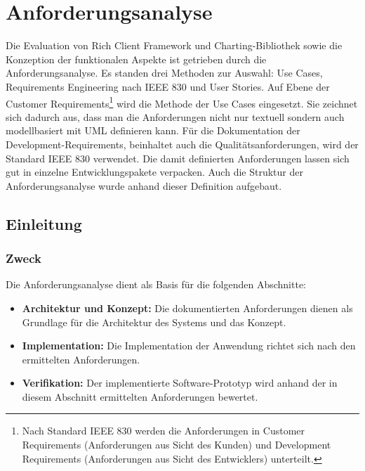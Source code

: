 \chapter{Anforderungsanalyse}\label{anforderungsanalyse}
Die Evaluation von Rich Client Framework und Charting-Bibliothek sowie die Konzeption der funktionalen Aspekte ist getrieben durch die Anforderungsanalyse. Es standen drei Methoden zur Auswahl: Use Cases, Requirements Engineering nach IEEE 830 und User Stories. Auf Ebene der Customer Requirements\footnote{Nach Standard IEEE 830\cite{ wiki:ieee830} werden die Anforderungen in Customer Requirements (Anforderungen aus Sicht des Kunden) und Development Requirements (Anforderungen aus Sicht des Entwicklers) unterteilt. } wird die Methode der Use Cases eingesetzt. Sie zeichnet sich dadurch aus, dass man die Anforderungen nicht nur textuell sondern auch modellbasiert mit UML definieren kann. Für die Dokumentation der Development-Requirements, beinhaltet auch die Qualitätsanforderungen, wird der Standard IEEE 830 verwendet. Die damit definierten Anforderungen lassen sich gut in einzelne Entwicklungspakete verpacken. Auch die Struktur der Anforderungsanalyse wurde anhand dieser Definition aufgebaut.


\section{Einleitung}
\subsection{Zweck}
Die Anforderungsanalyse dient als Basis für die folgenden Abschnitte:

\begin{itemize}
	\item \textbf{Architektur und Konzept:}  Die dokumentierten Anforderungen dienen als Grundlage für die Architektur des Systems und das Konzept. 
	\item \textbf{Implementation:} Die Implementation der Anwendung richtet sich nach den ermittelten Anforderungen. 
	\item \textbf{Verifikation:} Der implementierte Software-Prototyp wird anhand der in diesem Abschnitt ermittelten Anforderungen bewertet. 
\end{itemize}

